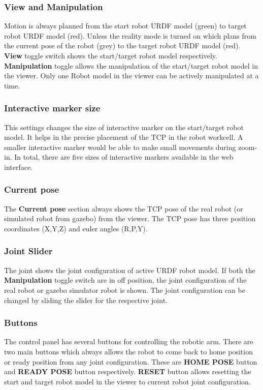 \subsubsection{View and Manipulation}
\label{subsubsec:web-ui-view-manipulation}
Motion is always planned from the start robot URDF model (green) to target robot URDF model (red). Unless the reality mode is turned on which plans from the current pose of the robot (grey) to the target robot URDF model (red). \textbf{View} toggle switch shows the start/target robot model respectively. \textbf{Manipulation} toggle allows the manipulation of the start/target robot model in the viewer. Only one Robot model in the viewer can be actively manipulated at a time.


\subsubsection{Interactive marker size}
\label{subsubsec:web-ui-im-size}
This settings changes the size of interactive marker on the start/target robot model. It helps in the precise placement of the TCP in the robot workcell. A smaller interactive marker would be able to make small movements during zoom-in. In total, there are five sizes of interactive markers available in the web interface.


\subsubsection{Current pose}
\label{subsubsec:web-ui-current-pose}
The \textbf{Current pose} section always shows the TCP pose of the real robot (or simulated robot from gazebo) from the viewer. The TCP pose has three position coordinates (X,Y,Z) and euler angles (R,P,Y).

\subsubsection{Joint Slider}
\label{subsubsec:web-ui-joint-slider}
The joint shows the joint configuration of active URDF robot model. If both the \textbf{Manipulation} toggle switch are in off position, the joint configuration of the real robot or gazebo simulator robot is shown. The joint configuration can be changed by sliding the slider for the respective joint.

\subsubsection{Buttons}
\label{subsubsec:web-ui-buttons}
The control panel has several buttons for controlling the robotic arm. There are two main buttons which always allows the robot to come back to home position or ready position from any joint configuration. These are \textbf{HOME POSE} button and \textbf{READY POSE} button respectively. \textbf{RESET} button allows resetting the start and target robot model in the viewer to current robot joint configuration.

